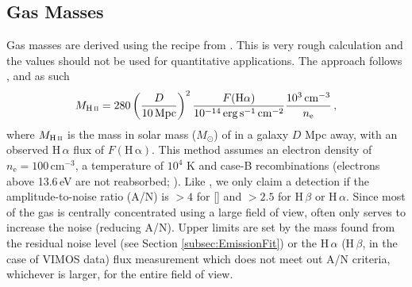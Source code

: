 
	\subsection{Gas Masses}
		\label{subsec:GasMass}

		Gas masses are derived using the recipe from \citet{Sarzi2005}. This is very rough calculation and the values should not be used for quantitative applications. The approach follows \citet{Kim1989}, and as such
		\begin{equation}
			M_\text{\ion{H}{ii}} = 280 \left(\frac{D}{10\, \mathrm{Mpc}}\right)^2 \frac{F(\mathrm{H\alpha})}{10^{-14} \, \mathrm{erg \, s^{-1} \, cm^{-2}}} \frac{10^3 \, \mathrm{cm^{-3}}}{n_\mathrm{e}} \, ,
		\end{equation}
		where $M_\text{\ion{H}{ii}}$ is the mass in solar mass ($M_\odot$) of  in a galaxy $D$ Mpc away, with an observed H\,$\alpha$ flux of $F(\mathrm{H\,\alpha})$. This method assumes an electron density of $n_\mathrm{e} = 100 \, \mathrm{cm^{-3}}$, a temperature of $10^4$ K and case-B recombinations (electrons above 13.6\,eV are not reabsorbed; \citealt[e.g.][p.\,74]{Osterbrock1974}). Like \citet{Sarzi2005}, we only claim a detection if the amplitude-to-noise ratio (A/N) is $>4$ for [] and $>2.5$ for H\,$\beta$ or H\,$\alpha$. Since most of the gas is centrally concentrated using a large field of view, often only serves to increase the noise (reducing A/N). 
		Upper limits are set by the mass found from the residual noise level (see Section \ref{subsec:EmissionFit}) or the H\,$\alpha$ (H\,$\beta$, in the case of VIMOS data) flux measurement which does not meet out A/N criteria, whichever is larger, for the entire field of view.



